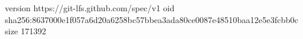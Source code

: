 version https://git-lfs.github.com/spec/v1
oid sha256:8637000e1f057a6d20a6258bc57bbea3ada80ce0087e48510baa12e5e3fcbb0c
size 171392
